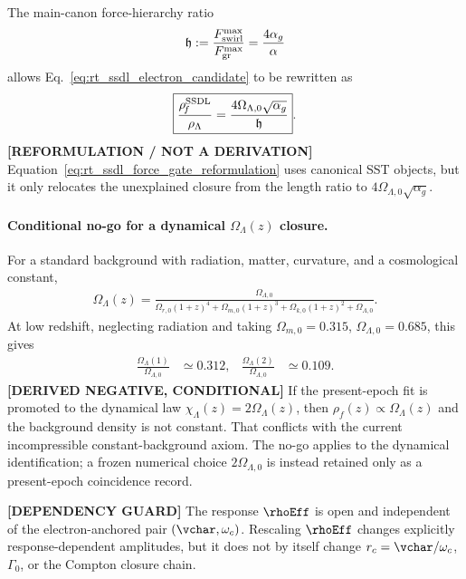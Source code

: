 The main-canon force-hierarchy ratio
\begin{align}
    \mathfrak h
    :=
    \frac{F_{\rm swirl}^{\max}}{F_{\rm gr}^{\max}}
    =
    \frac{4\alpha_g}{\alpha}
\end{align}
allows Eq.~\eqref{eq:rt_ssdl_electron_candidate} to be rewritten as
\begin{align}
    \boxed{
    \frac{\rho_{\!f}^{\rm SSDL}}{\rho_\Lambda}
    =
    \frac{4\Omega_{\Lambda,0}\sqrt{\alpha_g}}{\mathfrak h}
    } .
    \label{eq:rt_ssdl_force_gate_reformulation}
\end{align}
\textbf{[REFORMULATION / NOT A DERIVATION]} Equation~\eqref{eq:rt_ssdl_force_gate_reformulation}
uses canonical SST objects, but it only relocates the unexplained closure from
the length ratio to \(4\Omega_{\Lambda,0}\sqrt{\alpha_g}\).

\paragraph{Conditional no-go for a dynamical \(\Omega_\Lambda(z)\) closure.}
For a standard background with radiation, matter, curvature, and a
cosmological constant,
\begin{align}
    \Omega_\Lambda(z)
    =
    \frac{\Omega_{\Lambda,0}}{
        \Omega_{r,0}(1+z)^4
        +\Omega_{m,0}(1+z)^3
        +\Omega_{k,0}(1+z)^2
        +\Omega_{\Lambda,0}}
    .
    \label{eq:rt_ssdl_omega_lambda_epoch}
\end{align}
At low redshift, neglecting radiation and taking
\(\Omega_{m,0}=0.315\), \(\Omega_{\Lambda,0}=0.685\), this gives
\begin{align}
    \frac{\Omega_\Lambda(1)}{\Omega_{\Lambda,0}}
    &\simeq 0.312,
    &
    \frac{\Omega_\Lambda(2)}{\Omega_{\Lambda,0}}
    &\simeq 0.109 .
\end{align}
\textbf{[DERIVED NEGATIVE, CONDITIONAL]} If the present-epoch fit is promoted
to the dynamical law
\(\chi_\Lambda(z)=2\Omega_\Lambda(z)\), then
\(\rho_{\!f}(z)\propto\Omega_\Lambda(z)\) and the background density is not
constant.  That conflicts with the current incompressible constant-background
axiom.  The no-go applies to the dynamical identification; a frozen numerical
choice \(2\Omega_{\Lambda,0}\) is instead retained only as a present-epoch
coincidence record.

\textbf{[DEPENDENCY GUARD]} The response \(\rhoEff\) is open and
independent of the electron-anchored pair \((\vchar,\omega_c)\).  Rescaling
\(\rhoEff\) changes explicitly response-dependent amplitudes, but it does
not by itself change \(r_c=\vchar/\omega_c\), \(\Gamma_0\), or the
Compton closure chain.

